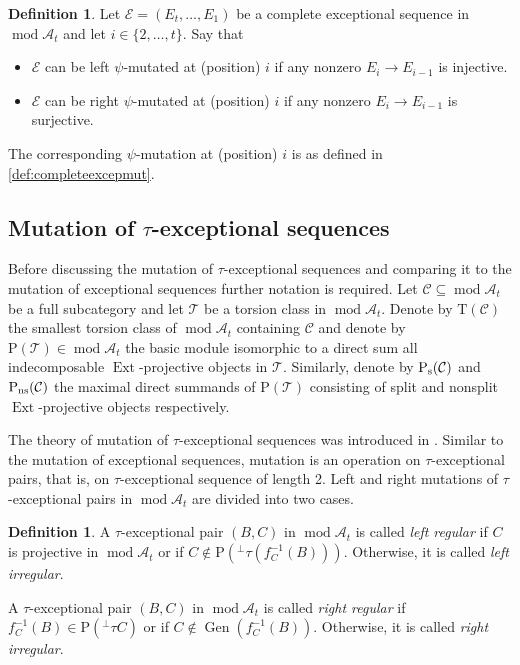 \documentclass[10pt,twoside, a4paper,reqno]{amsart}
\DeclareMathOperator{\mods}{mod}
\DeclareMathOperator{\Ext}{Ext}
\DeclareMathOperator{\Gen}{Gen}
\newcommand{\A}{\mathscr{A}}
\newcommand{\Ccal}{\mathcal{C}}
\newcommand{\Ecal}{\mathcal{E}}
\newcommand{\Tcal}{\mathcal{T}}
\newcommand{\Trm}{\mathrm{T}}
\newcommand{\Prm}{\mathrm{P}}
\newcommand{\nsplit}{\textnormal{ns}}
\newcommand{\ssplit}{\textnormal{s}}
\theoremstyle{definition}
\newtheorem{definition}[theorem]{Definition}
\begin{document}
\begin{definition}\label{def:psimut}
    Let $\Ecal= (E_t, \dots, E_1)$ be a complete exceptional sequence in $\mods \A_t$ and let $i \in \{2, \dots, t\}$. Say that 
    \begin{itemize}
        \item $\Ecal$ can be left $\psi$-mutated at (position) $i$ if any nonzero $E_{i} \to E_{i-1}$ is injective.
        \item $\Ecal$ can be right $\psi$-mutated at (position) $i$ if any nonzero $E_{i} \to E_{i-1}$ is surjective. 
    \end{itemize}
    The corresponding $\psi$-mutation at (position) $i$ is as defined in \cref{def:completeexcepmut}.
\end{definition}



\subsection{Mutation of $\tau$-exceptional sequences}
Before discussing the mutation of $\tau$-exceptional sequences and comparing it to the mutation of exceptional sequences further notation is required. Let $\Ccal \subseteq \mods \A_t$ be a full subcategory and let $\Tcal$ be a torsion class in $\mods \A_t$. Denote by $\Trm(\Ccal)$ the smallest torsion class of $\mods \A_t$ containing $\Ccal$ and denote by $\Prm(\Tcal) \in \mods \A_t$ the basic module isomorphic to a direct sum all indecomposable $\Ext$-projective objects in $\Tcal$. Similarly, denote by $\Prm_{\ssplit}(\Ccal)$ and $\Prm_{\nsplit}(\Ccal)$ the maximal direct summands of $\Prm(\Tcal)$ consisting of split and nonsplit $\Ext$-projective objects respectively.

The theory of mutation of $\tau$-exceptional sequences was introduced in \cite{BHM2024}. Similar to the mutation of exceptional sequences, mutation is an operation on $\tau$-exceptional pairs, that is, on $\tau$-exceptional sequence of length 2. Left and right mutations of $\tau$-exceptional pairs in $\mods \A_t$ are divided into two cases. 

\begin{definition}\label{defn:leftrightregular} \cite[Def. 3.11]{BHM2024}
    A $\tau$-exceptional pair $(B,C)$ in $\mods \A_t$ is called \textit{left regular} if $C$ is projective in $\mods \A_t$ or if $C \not \in \Prm( {}^\perp \tau (f_C^{-1}(B)))$. Otherwise, it is called \textit{left irregular}.
    
    A $\tau$-exceptional pair $(B,C)$ in $\mods \A_t$ is called \textit{right regular} if $f_C^{-1}(B) \in \Prm({}^\perp \tau C)$ or if $C \not \in \Gen(f_C^{-1}(B))$. Otherwise, it is called \textit{right irregular}.
\end{definition}
\end{document}
